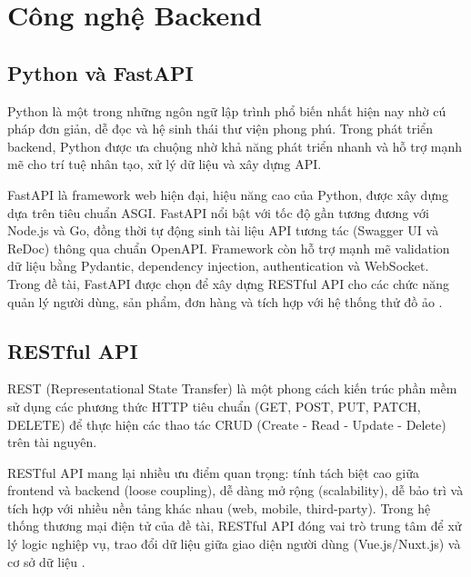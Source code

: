 \section{Công nghệ Backend}

\subsection{Python và FastAPI}
Python là một trong những ngôn ngữ lập trình phổ biến nhất hiện nay nhờ cú pháp đơn giản, dễ đọc và hệ sinh thái thư viện phong phú. Trong phát triển backend, Python được ưa chuộng nhờ khả năng phát triển nhanh và hỗ trợ mạnh mẽ cho trí tuệ nhân tạo, xử lý dữ liệu và xây dựng API.

FastAPI là framework web hiện đại, hiệu năng cao của Python, được xây dựng dựa trên tiêu chuẩn ASGI. FastAPI nổi bật với tốc độ gần tương đương với Node.js và Go, đồng thời tự động sinh tài liệu API tương tác (Swagger UI và ReDoc) thông qua chuẩn OpenAPI. Framework còn hỗ trợ mạnh mẽ validation dữ liệu bằng Pydantic, dependency injection, authentication và WebSocket. Trong đề tài, FastAPI được chọn để xây dựng RESTful API cho các chức năng quản lý người dùng, sản phẩm, đơn hàng và tích hợp với hệ thống thử đồ ảo \cite{python_fastapi_official}.

\subsection{RESTful API}
REST (Representational State Transfer) là một phong cách kiến trúc phần mềm sử dụng các phương thức HTTP tiêu chuẩn (GET, POST, PUT, PATCH, DELETE) để thực hiện các thao tác CRUD (Create - Read - Update - Delete) trên tài nguyên. 

RESTful API mang lại nhiều ưu điểm quan trọng: tính tách biệt cao giữa frontend và backend (loose coupling), dễ dàng mở rộng (scalability), dễ bảo trì và tích hợp với nhiều nền tảng khác nhau (web, mobile, third-party). Trong hệ thống thương mại điện tử của đề tài, RESTful API đóng vai trò trung tâm để xử lý logic nghiệp vụ, trao đổi dữ liệu giữa giao diện người dùng (Vue.js/Nuxt.js) và cơ sở dữ liệu \cite{fielding_rest}.